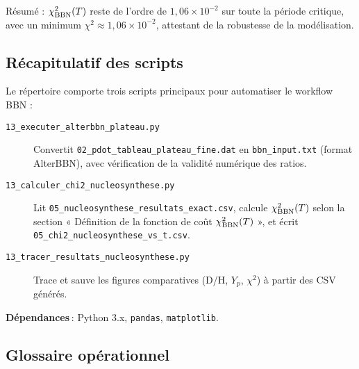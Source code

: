 {\small Résumé : \(\chi^2_{\rm BBN}(T)\) reste de l’ordre de \(1{,}06\times10^{-2}\) sur toute la période critique, avec un minimum \(\chi^2\approx1{,}06\times10^{-2}\), attestant de la robustesse de la modélisation.}

\subsection{Récapitulatif des scripts}

Le répertoire comporte trois scripts principaux pour automatiser le workflow BBN :

\begin{description}
  \item[\texttt{13\_executer\_alterbbn\_plateau.py}]
    Convertit \texttt{02\_pdot\_tableau\_plateau\_fine.dat} en \texttt{bbn\_input.txt} (format AlterBBN), avec vérification de la validité numérique des ratios.

  \item[\texttt{13\_calculer\_chi2\_nucleosynthese.py}]
    Lit \texttt{05\_nucleosynthese\_resultats\_exact.csv}, calcule \(\chi^{2}_{\rm BBN}(T)\) selon la section « Définition de la fonction de coût \(\chi^{2}_{\rm BBN}(T)\) », et écrit \texttt{05\_chi2\_nucleosynthese\_vs\_t.csv}.

  \item[\texttt{13\_tracer\_resultats\_nucleosynthese.py}]
    Trace et sauve les figures comparatives (D/H, \(Y_{p}\), \(\chi^{2}\)) à partir des CSV générés.
\end{description}

\noindent\textbf{Dépendances} : Python 3.x, \texttt{pandas}, \texttt{matplotlib}.

\subsection*{Glossaire opérationnel}

